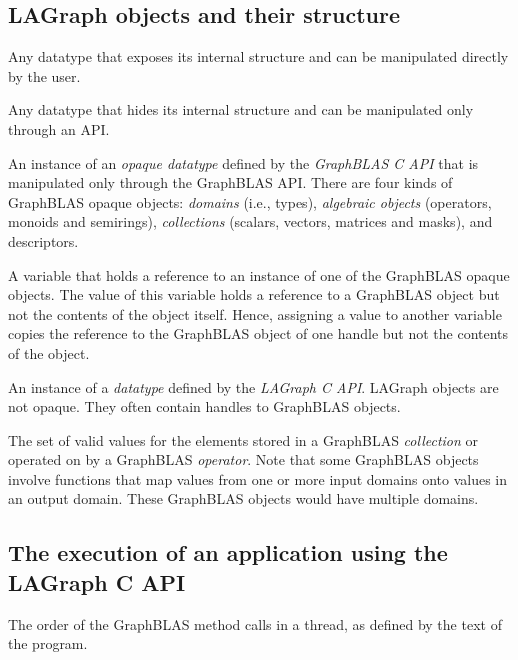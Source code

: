 
\subsection{LAGraph objects and their structure}

\glossBegin
{} Any datatype that exposes its internal structure and
can be manipulated directly by the user.   

 Any datatype that hides its internal structure and can
be manipulated only through an API.

  An instance of an \emph{opaque datatype} defined 
by the \emph{GraphBLAS C API} that is manipulated only through the GraphBLAS 
API. There are four kinds of GraphBLAS opaque objects: \emph{domains} (i.e., types), 
\emph{algebraic objects} (operators, monoids and semirings), 
\emph{collections} (scalars, vectors, matrices and masks), and descriptors.   

  A variable that holds a reference to an instance of one of 
the GraphBLAS opaque objects.  The value of this variable holds a reference to 
a GraphBLAS object but not the contents of the object itself.  Hence, assigning 
a value to another variable copies the reference to the GraphBLAS object of one 
handle but not the contents of the object.

  An instance of a \emph{datatype} defined 
by the \emph{LAGraph C API}.  LAGraph objects are not opaque.  They
often contain handles to GraphBLAS objects.     

 The set of valid values for the elements stored in a 
GraphBLAS \emph{collection} or operated on by a GraphBLAS \emph{operator}.
Note that some GraphBLAS objects involve functions that map values from 
one or more input domains onto values in an output domain.  These GraphBLAS 
objects would have multiple domains.
\glossEnd


\subsection{The execution of an application using the LAGraph C API}

\glossBegin
{} The order of the GraphBLAS method calls in a
thread, as defined by the text of the program.

